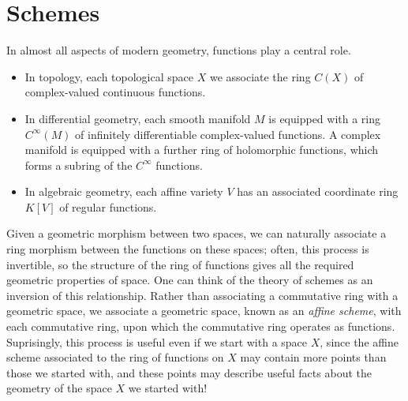 \chapter{Schemes}

In almost all aspects of modern geometry, functions play a central role.
%
\begin{itemize}
    \item In topology, each topological space $X$ we associate the ring $C(X)$ of complex-valued continuous functions.
    \item In differential geometry, each smooth manifold $M$ is equipped with a ring $C^\infty(M)$ of infinitely differentiable complex-valued functions. A complex manifold is equipped with a further ring of holomorphic functions, which forms a subring of the $C^\infty$ functions.
    \item In algebraic geometry, each affine variety $V$ has an associated coordinate ring $K[V]$ of regular functions.
\end{itemize}
%
Given a geometric morphism between two spaces, we can naturally associate a ring morphism between the functions on these spaces; often, this process is invertible, so the structure of the ring of functions gives all the required geometric properties of space. One can think of the theory of schemes as an inversion of this relationship. Rather than associating a commutative ring with a geometric space, we associate a geometric space, known as an {\it affine scheme}, with each commutative ring, upon which the commutative ring operates as functions. Suprisingly, this process is useful even if we start with a space $X$, since the affine scheme associated to the ring of functions on $X$ may contain more points than those we started with, and these points may describe useful facts about the geometry of the space $X$ we started with!

